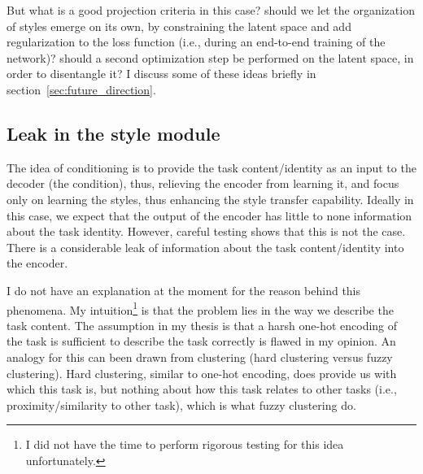     But what is a good projection criteria in this case? should we let the organization of styles emerge on its own, by constraining the latent space and add regularization to the loss function (i.e., during an end-to-end training of the network)? should a second optimization step be performed on the latent space, in order to disentangle it? I discuss some of these ideas briefly in section~\ref{sec:future_direction}.

  \subsection{Leak in the style module}

    \par The idea of conditioning is to provide the task content/identity as an input to the decoder (the condition), thus, relieving the encoder from learning it, and focus only on learning the styles, thus enhancing the style transfer capability. Ideally in this case, we expect that the output of the encoder has little to none information about the task identity. However, careful testing shows that this is not the case. There is a considerable leak of information about the task content/identity into the encoder.


    \par I do not have an explanation at the moment for the reason behind this phenomena. My intuition\footnote{I did not have the time to perform rigorous testing for this idea unfortunately.} is that the problem lies in the way we describe the task content. The assumption in my thesis is that a harsh one-hot encoding of the task is sufficient to describe the task correctly is flawed in my opinion. An analogy for this can been drawn from clustering (hard clustering versus fuzzy clustering). Hard clustering, similar to one-hot encoding, does provide us with which this task is, but nothing about how this task relates to other tasks (i.e., proximity/similarity to other task), which is what fuzzy clustering do.


